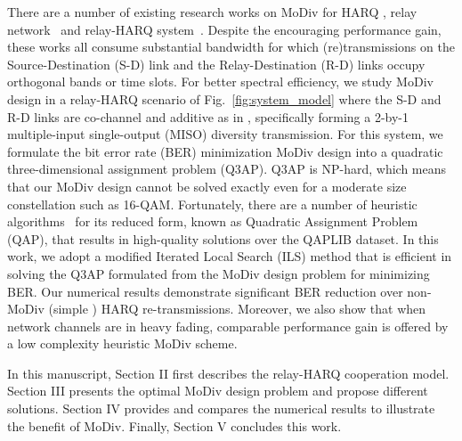 \documentclass[journal]{IEEEtran}
\begin{document}
There are a number of existing research works on MoDiv for HARQ
\cite{harvind2005symbol}, relay network~\cite{seddik2008trans, khormuji2008rate}
and relay-HARQ system~\cite{kim2009design, ryu2011ber}. Despite the encouraging
performance gain, these works all consume substantial bandwidth for which
(re)transmissions on the Source-Destination (S-D) link and the Relay-Destination
(R-D) links occupy orthogonal bands or time slots. For better spectral
efficiency, we study MoDiv design in a relay-HARQ scenario of
Fig.~\ref{fig:system_model} where the S-D and R-D links are co-channel and
additive as in \cite{cover1979capacity, nabar2004fading}, specifically
forming a 2-by-1 multiple-input single-output (MISO) diversity transmission. 
For this system, we formulate the bit error rate (BER) minimization MoDiv
design into a quadratic three-dimensional assignment problem (Q3AP). 
Q3AP is NP-hard, which means that our MoDiv design cannot be solved exactly 
even for a moderate size constellation such as 16-QAM. Fortunately, there are
a number of heuristic algorithms~\cite{benlic2015memetic} for its reduced form,
known as Quadratic Assignment Problem (QAP), that results in high-quality
solutions over the QAPLIB dataset. In this work, we adopt a modified Iterated
Local Search (ILS) method that is efficient in solving the Q3AP formulated from
the  MoDiv design problem for minimizing BER. Our numerical results demonstrate
significant BER reduction over non-MoDiv (simple ) HARQ re-transmissions.
Moreover, we also show that when network channels are in heavy fading,
comparable performance gain is offered by a low complexity heuristic MoDiv scheme.

In this manuscript, Section II first describes the relay-HARQ cooperation model.
Section III presents the optimal MoDiv design problem and propose different
solutions. Section IV provides and compares the numerical results to illustrate
the benefit of MoDiv. Finally, Section V concludes this work. 
\end{document}
